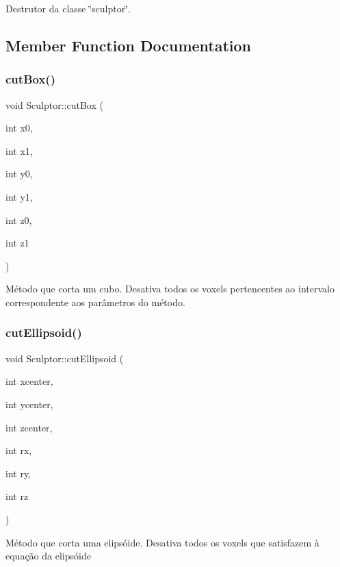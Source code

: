 Destrutor da classe \char`\"{}sculptor\char`\"{}. 

\subsection{Member Function Documentation}
\mbox{\label{classSculptor_aa84a1b12b09e9e103fc8d78f8d1bc00f}} 
\subsubsection{\texorpdfstring{cutBox()}{cutBox()}}
{\footnotesize\ttfamily void Sculptor\+::cut\+Box (\begin{DoxyParamCaption}\item[{int}]{x0,  }\item[{int}]{x1,  }\item[{int}]{y0,  }\item[{int}]{y1,  }\item[{int}]{z0,  }\item[{int}]{z1 }\end{DoxyParamCaption})}

Método que corta um cubo. Desativa todos os voxels pertencentes ao intervalo correspondente aos parâmetros do método. \mbox{\label{classSculptor_a18d2922c111c4c13653ee07d878151ad}} 
\subsubsection{\texorpdfstring{cutEllipsoid()}{cutEllipsoid()}}
{\footnotesize\ttfamily void Sculptor\+::cut\+Ellipsoid (\begin{DoxyParamCaption}\item[{int}]{xcenter,  }\item[{int}]{ycenter,  }\item[{int}]{zcenter,  }\item[{int}]{rx,  }\item[{int}]{ry,  }\item[{int}]{rz }\end{DoxyParamCaption})}

Método que corta uma elipsóide. Desativa todos os voxels que satisfazem à equação da elipsóide \mbox{\label{classSculptor_a67ab8c0ba5116adb8af1d01ad373ac15}} 
